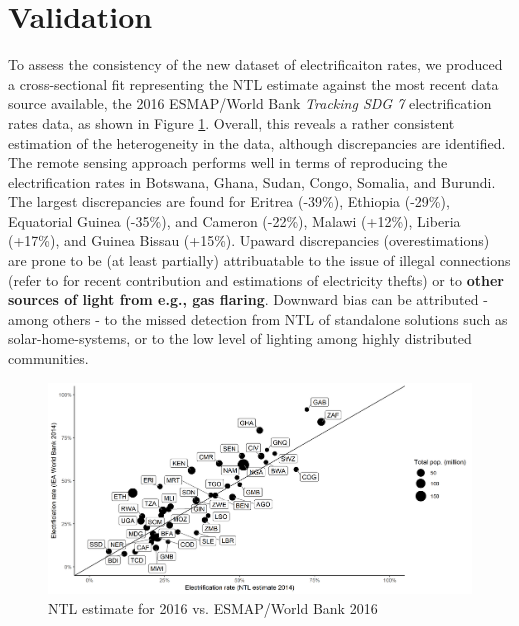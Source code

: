 \documentclass[preprint,12pt]{elsarticle}
\begin{document}
\section{Validation}
To assess the consistency of the new dataset of electrificaiton rates, we produced a cross-sectional fit representing the NTL estimate against the most recent data source available, the 2016 ESMAP/World Bank \textit{Tracking SDG 7} electrification rates data, as shown in Figure \ref{ntlesmap}. Overall, this reveals a rather consistent estimation of the heterogeneity in the data, although discrepancies are identified. The remote sensing approach performs well in terms of reproducing the electrification rates in Botswana, Ghana, Sudan, Congo, Somalia, and Burundi. The largest discrepancies are found for Eritrea (-39\%), Ethiopia (-29\%), Equatorial Guinea (-35\%), and Cameron (-22\%), Malawi (+12\%), Liberia (+17\%), and Guinea Bissau (+15\%). Upaward discrepancies (overestimations) are prone to be (at least partially) attribuatable to the issue of illegal connections (refer to \citep{de2018kenya, yakubu2018electricity} for recent contribution and estimations of electricity thefts) or to \textbf{other sources of light from e.g., gas flaring}. Downward bias can be attributed - among others - to the missed detection from NTL of standalone solutions such as solar-home-systems, or to the low level of lighting among highly distributed communities. 

\begin{figure}[H]
    \centering
    \includegraphics[scale=0.5]{figures/comparisonwb.png}
    \caption{NTL estimate for 2016 vs. ESMAP/World Bank 2016}
    \label{ntlesmap}
\end{figure}
\end{document}
